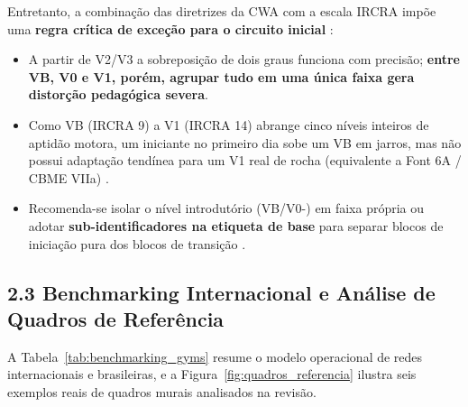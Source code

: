
Entretanto, a combinação das diretrizes da CWA com a escala IRCRA impõe uma \textbf{regra crítica de exceção para o circuito inicial} \cite{cwa_setting, ircra_draper}:
\begin{itemize}
    \item A partir de V2/V3 a sobreposição de dois graus funciona com precisão; \textbf{entre VB, V0 e V1, porém, agrupar tudo em uma única faixa gera distorção pedagógica severa}.
    \item Como VB (IRCRA 9) a V1 (IRCRA 14) abrange cinco níveis inteiros de aptidão motora, um iniciante no primeiro dia sobe um VB em jarros, mas não possui adaptação tendínea para um V1 real de rocha (equivalente a Font 6A / CBME VIIa) \cite{ircra_draper, cbme_dt01}.
    \item Recomenda-se isolar o nível introdutório (VB/V0-) em faixa própria ou adotar \textbf{sub-identificadores na etiqueta de base} para separar blocos de iniciação pura dos blocos de transição \cite{cwa_setting, topclimbing_platform}.
\end{itemize}

\subsection*{2.3 Benchmarking Internacional e Análise de Quadros de Referência}

A Tabela~\ref{tab:benchmarking_gyms} resume o modelo operacional de redes internacionais e brasileiras, e a Figura~\ref{fig:quadros_referencia} ilustra seis exemplos reais de quadros murais analisados na revisão.


